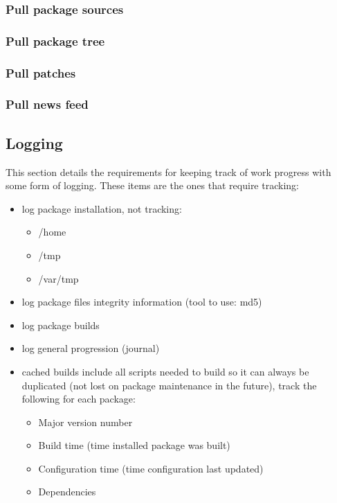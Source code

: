 %
%
\subsubsection{Pull package sources}


\subsubsection{Pull package tree}


\subsubsection{Pull patches}


\subsubsection{Pull news feed}




\newpage
\subsection{Logging}
This section details the requirements for keeping track of work progress
with some form of logging. These items are the ones that require tracking:

\begin{itemize}
  \item log package installation, not tracking:

  \begin{itemize}
    \item /home
    \item /tmp
		\item /var/tmp
  \end{itemize}

  \item log package files integrity information (tool to use: md5)
  \item log package builds
  \item log general progression (journal)
  \item cached builds include all scripts needed to build so it can always be duplicated (not lost on package maintenance in the future), track the following for each package:

\begin{itemize}
  \item Major version number
  \item Build time (time installed package was built)
  \item Configuration time (time configuration last updated)
  \item Dependencies 
\end{itemize}

\end{itemize}

